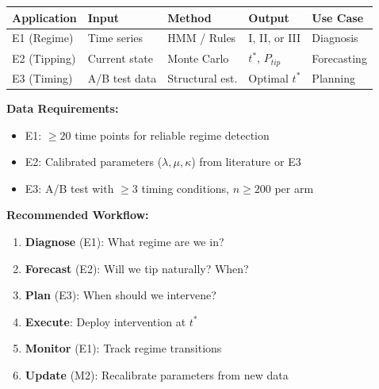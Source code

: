 \begin{tcolorbox}[colback=yellow!5!white, colframe=yellow!75!black,
    title=\textbf{UNTCM Empirical Applications: Quick Reference}]

\begin{center}
\renewcommand{\arraystretch}{1.3}
\begin{tabular}{@{}lllll@{}}
\toprule
\textbf{Application} & \textbf{Input} & \textbf{Method} & \textbf{Output} & \textbf{Use Case} \\
\midrule
E1 (Regime) & Time series & HMM / Rules & I, II, or III & Diagnosis \\
E2 (Tipping) & Current state & Monte Carlo & $t^*$, $P_{tip}$ & Forecasting \\
E3 (Timing) & A/B test data & Structural est. & Optimal $t^*$ & Planning \\
\bottomrule
\end{tabular}
\end{center}

\textbf{Data Requirements:}
\begin{itemize}[nosep]
\item E1: $\geq 20$ time points for reliable regime detection
\item E2: Calibrated parameters ($\lambda, \mu, \kappa$) from literature or E3
\item E3: A/B test with $\geq 3$ timing conditions, $n \geq 200$ per arm
\end{itemize}

\textbf{Recommended Workflow:}
\begin{enumerate}[nosep]
\item \textbf{Diagnose} (E1): What regime are we in?
\item \textbf{Forecast} (E2): Will we tip naturally? When?
\item \textbf{Plan} (E3): When should we intervene?
\item \textbf{Execute}: Deploy intervention at $t^*$
\item \textbf{Monitor} (E1): Track regime transitions
\item \textbf{Update} (M2): Recalibrate parameters from new data
\end{enumerate}

\end{tcolorbox}


